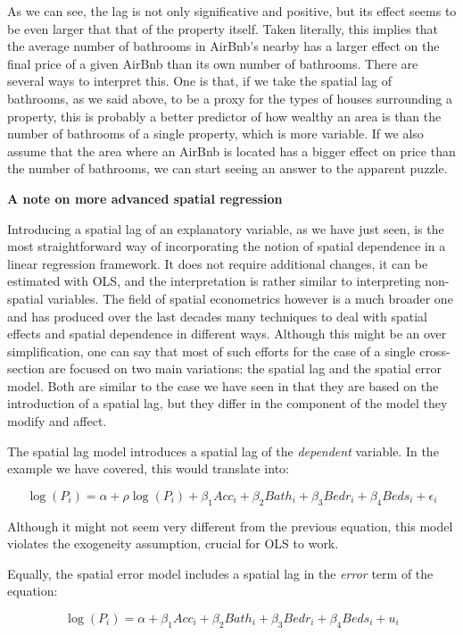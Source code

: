\documentclass[
  letterpaper,
  krantz2]{style/krantz}
\begin{document}
As we can see, the lag is not only significative and positive, but its
effect seems to be even larger that that of the property itself. Taken
literally, this implies that the average number of bathrooms in AirBnb's
nearby has a larger effect on the final price of a given AirBnb than its
own number of bathrooms. There are several ways to interpret this. One
is that, if we take the spatial lag of bathrooms, as we said above, to
be a proxy for the types of houses surrounding a property, this is
probably a better predictor of how wealthy an area is than the number of
bathrooms of a single property, which is more variable. If we also
assume that the area where an AirBnb is located has a bigger effect on
price than the number of bathrooms, we can start seeing an answer to the
apparent puzzle.

\textbf{A note on more advanced spatial regression}

Introducing a spatial lag of an explanatory variable, as we have just
seen, is the most straightforward way of incorporating the notion of
spatial dependence in a linear regression framework. It does not require
additional changes, it can be estimated with OLS, and the interpretation
is rather similar to interpreting non-spatial variables. The field of
spatial econometrics however is a much broader one and has produced over
the last decades many techniques to deal with spatial effects and
spatial dependence in different ways. Although this might be an over
simplification, one can say that most of such efforts for the case of a
single cross-section are focused on two main variations: the spatial lag
and the spatial error model. Both are similar to the case we have seen
in that they are based on the introduction of a spatial lag, but they
differ in the component of the model they modify and affect.

The spatial lag model introduces a spatial lag of the \emph{dependent}
variable. In the example we have covered, this would translate into:

\[
\log(P_i) = \alpha + \rho \log(P_i) + \beta_1 Acc_i + \beta_2 Bath_i + \beta_3 Bedr_i + \beta_4 Beds_i + \epsilon_i
\]

Although it might not seem very different from the previous equation,
this model violates the exogeneity assumption, crucial for OLS to work.

Equally, the spatial error model includes a spatial lag in the
\emph{error} term of the equation:

\[
\log(P_i) = \alpha + \beta_1 Acc_i + \beta_2 Bath_i + \beta_3 Bedr_i + \beta_4 Beds_i + u_i
\]
\end{document}
